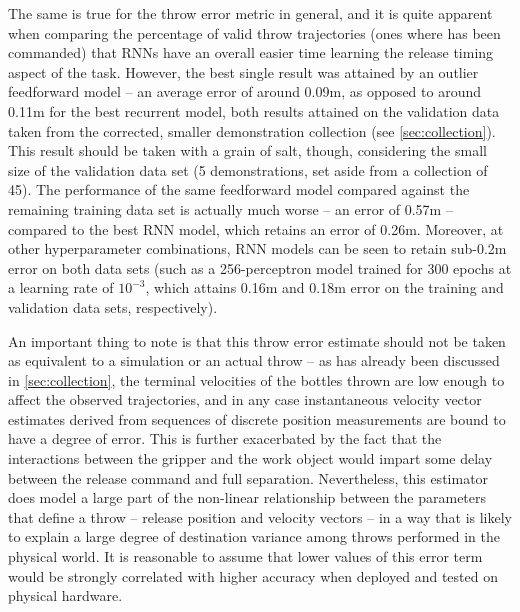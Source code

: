 \documentclass{article}
\begin{document}
The same is true for the throw error metric in general, and it is quite apparent when comparing the percentage of valid throw trajectories (ones where has been commanded) that RNNs have an overall easier time learning the release timing aspect of the task. However, the best single result was attained by an outlier feedforward model -- an average error of around 0.09m, as opposed to around 0.11m for the best recurrent model, both results attained on the validation data taken from the corrected, smaller demonstration collection (see \ref{sec:collection}). This result should be taken with a grain of salt, though, considering the small size of the validation data set (5 demonstrations, set aside from a collection of 45). The performance of the same feedforward model compared against the remaining training data set is actually much worse -- an error of 0.57m -- compared to the best RNN model, which retains an error of 0.26m. Moreover, at other hyperparameter combinations, RNN models can be seen to retain sub-0.2m error on both data sets (such as a 256-perceptron model trained for 300 epochs at a learning rate of $10^{-3}$, which attains 0.16m and 0.18m error on the training and validation data sets, respectively).

An important thing to note is that this throw error estimate should not be taken as equivalent to a simulation or an actual throw -- as has already been discussed in \ref{sec:collection}, the terminal velocities of the bottles thrown are low enough to affect the observed trajectories, and in any case instantaneous velocity vector estimates derived from sequences of discrete position measurements are bound to have a degree of error. This is further exacerbated by the fact that the interactions between the gripper and the work object would impart some delay between the release command and full separation. Nevertheless, this estimator does model a large part of the non-linear relationship between the parameters that define a throw -- release position and velocity vectors -- in a way that is likely to explain a large degree of destination variance among throws performed in the physical world. It is reasonable to assume that lower values of this error term would be strongly correlated with higher accuracy when deployed and tested on physical hardware.
\end{document}
